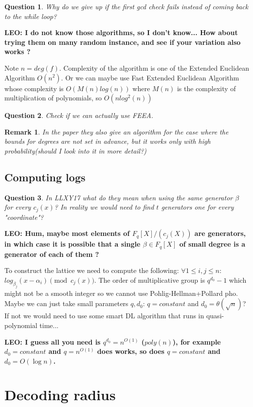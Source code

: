 \documentclass[12pt]{article}
\newtheorem{question}{Question}
\newtheorem{remark}{Remark}
\begin{document}
\begin{question}
Why do we give up if the first gcd check fails instead of coming back to the while loop?
\end{question}
{\bf LEO: I do not know those algorithms, so I don't know... How about trying them on many random instance, and see if your variation also works ?}


Note $n = deg(f)$.
Complexity of the algorithm is one of the Extended Euclidean Algorithm $O(n^2)$. Or we can maybe use Fast Extended Euclidean Algorithm whose complexity is $O(M(n)log(n))$ where $M(n)$ is the complexity of multiplication of polynomials, so $O(nlog^2(n))$
\begin{question}
Check if we can actually use FEEA.
\end{question}
\begin{remark}
In the paper they also give an algorithm for the case where the bounds for degrees are not set in advance, but it works only with high probability(should I look into it in more detail?)
\end{remark}
\subsection{Computing logs}
\begin{question}
In LLXY17 what do they mean when using the same generator $\beta$ for every $c_j(x)$? In reality we would need to find $t$ generators one for every "coordinate"?
\end{question}
{\bf LEO: Hum, maybe most elements of $F_q[X]/(c_j(X))$ are generators, in which case it is possible that a single $\beta \in F_q[X]$ of small degree is a generator of each of them ?}

To construct the lattice we need to compute the following:
$\forall 1 \leq i,j \leq n :$ $log_{\beta_j}(x - \alpha_i) \pmod{c_j(x)}$. The order of multiplicative group is $q^{d_0} - 1$ which might not be a smooth integer so we cannot use Pohlig-Hellman+Pollard pho. Maybe we can just take small parameters $q, d_0$: $q=constant$ and $d_0 = \theta(\sqrt n)$? If not we would need to use some smart DL algorithm that runs in quasi-polynomial time...

{\bf LEO: I guess all you need is $q^{d_0} = n^{O(1)}$ ($poly(n)$), for example $d_0 = constant$ and $q=n^{O(1)}$ does works, so does $q=constant$ and $d_0 = O(\log n)$.}

\section{Decoding radius}
\end{document}
